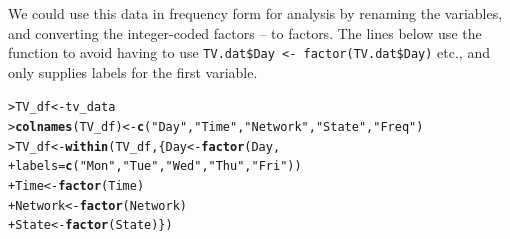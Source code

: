 \documentclass[10pt,krantz2]{krantz}\usepackage[]{graphicx}\usepackage[]{color}
\makeatletter
\newcommand{\hlstr}[1]{\textcolor[rgb]{0.192,0.494,0.8}{#1}}%
\newcommand{\hlstd}[1]{\textcolor[rgb]{0.345,0.345,0.345}{#1}}%
\newcommand{\hlkwb}[1]{\textcolor[rgb]{0.69,0.353,0.396}{#1}}%
\newcommand{\hlkwc}[1]{\textcolor[rgb]{0.333,0.667,0.333}{#1}}%
\newcommand{\hlkwd}[1]{\textcolor[rgb]{0.737,0.353,0.396}{\textbf{#1}}}%
\newenvironment{kframe}{%
 \def\at@end@of@kframe{}%
 \ifinner\ifhmode%
  \def\at@end@of@kframe{\end{minipage}}%
  \begin{minipage}{\columnwidth}%
 \fi\fi%
 \def\FrameCommand##1{\hskip\@totalleftmargin \hskip-\fboxsep
 \colorbox{shadecolor}{##1}\hskip-\fboxsep
     \hskip-\linewidth \hskip-\@totalleftmargin \hskip\columnwidth}%
 \MakeFramed {\advance\hsize-\width
   \@totalleftmargin\z@ \linewidth\hsize
   \@setminipage}}%
 {\par\unskip\endMakeFramed%
 \at@end@of@kframe}
\newenvironment{knitrout}{}{} %
\renewenvironment{knitrout}{\small\renewcommand{\baselinestretch}{.85}}{} %
\makeatother
\begin{document}
We could use this data in frequency form for analysis by renaming the variables,
and converting the integer-coded factors  --  to \R factors.
The lines below use the function  to avoid having to use
\verb|TV.dat$Day <- factor(TV.dat$Day)| etc., and only supplies labels for the
first variable.
\begin{knitrout}\footnotesize
{}\color{fgcolor}\begin{kframe}
\begin{alltt}
\hlstd{> }\hlstd{TV_df} \hlkwb{<-} \hlstd{tv_data}
\hlstd{> }\hlkwd{colnames}\hlstd{(TV_df)} \hlkwb{<-} \hlkwd{c}\hlstd{(}\hlstr{"Day"}\hlstd{,} \hlstr{"Time"}\hlstd{,} \hlstr{"Network"}\hlstd{,} \hlstr{"State"}\hlstd{,} \hlstr{"Freq"}\hlstd{)}
\hlstd{> }\hlstd{TV_df} \hlkwb{<-} \hlkwd{within}\hlstd{(TV_df, \{Day} \hlkwb{<-} \hlkwd{factor}\hlstd{(Day,}
\hlstd{+ }                                      \hlkwc{labels} \hlstd{=} \hlkwd{c}\hlstd{(}\hlstr{"Mon"}\hlstd{,} \hlstr{"Tue"}\hlstd{,} \hlstr{"Wed"}\hlstd{,} \hlstr{"Thu"}\hlstd{,} \hlstr{"Fri"}\hlstd{))}
\hlstd{+ }                        \hlstd{Time} \hlkwb{<-} \hlkwd{factor}\hlstd{(Time)}
\hlstd{+ }                        \hlstd{Network} \hlkwb{<-} \hlkwd{factor}\hlstd{(Network)}
\hlstd{+ }                        \hlstd{State} \hlkwb{<-} \hlkwd{factor}\hlstd{(State)\})}
\end{alltt}
\end{kframe}
\end{knitrout}
\end{document}
